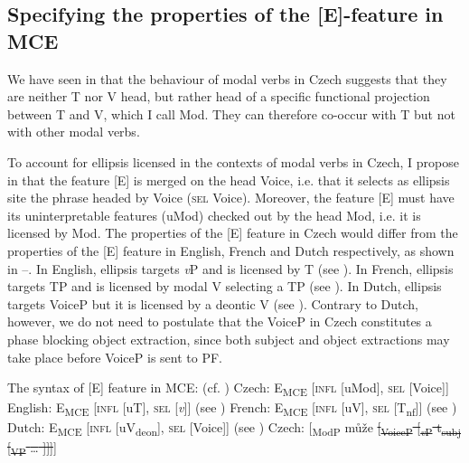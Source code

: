 \documentclass[output=paper,colorlinks,citecolor=brown,
modfonts
]{langscibook}
\begin{document}
\subsection{Specifying the properties of the [E]-feature in MCE} \label{sec:5.1} 

We have seen in  that the behaviour of modal verbs in Czech suggests that they are neither T nor V head, but rather head of a specific functional projection between T and V, which I call Mod. They can therefore co-occur with T but not with other modal verbs. 

To account for ellipsis licensed in the contexts of modal verbs in Czech, I propose in  that the feature [E] is merged on the head Voice, i.e. that it selects as ellipsis site the phrase headed by Voice (\textsc{sel} Voice). Moreover, the feature [E] must have its uninterpretable features (uMod) checked out by the head Mod, i.e. it is licensed by Mod. The properties of the [E] feature in Czech would differ from the properties of the [E] feature in English, French and Dutch respectively, as shown in --. In English, ellipsis targets \textit{v}P and is licensed by T (see \citealt{Merchant2008a}). In French, ellipsis targets TP and is licensed by modal V selecting a TP (see \citealt{Dagnac2008}). In Dutch, ellipsis targets VoiceP but it is licensed by a deontic V (see \citealt{Aelbrecht2008}). Contrary to Dutch, however, we do not need to postulate that the VoiceP in Czech constitutes a phase blocking object extraction, since both subject and object extractions may take place before VoiceP is sent to PF. 


\ea \label{31} The syntax of [E] feature in MCE:
\hfill{(cf. \citealt{Merchant2008a})}
\ea \label{31a} Czech: 	E\textsubscript{MCE} [\textsc{infl} [uMod], \textsc{sel} [Voice]] 
\ex \label{31b} English: E\textsubscript{MCE} [\textsc{infl} [uT], \textsc{sel} [\textit{v}]] \hfill (see \citealt{Merchant2008a})	%
\ex \label{31c} French:	E\textsubscript{MCE} [\textsc{infl} [uV], \textsc{sel} [T\textsubscript{nf}]] \hfill (see \citealt{Dagnac2008}) %
\ex \label{31d} Dutch:	E\textsubscript{MCE} [\textsc{infl} [uV\textsubscript{deon}], \textsc{sel} [Voice]] \hfill (see \citealt{Aelbrecht2008}) %
\z
\z
\ea \label{32}
\ea \label{32a} Czech:	[\textsubscript{ModP} může \sout{[\textsubscript{VoiceP} [\textsubscript{\textit{v}P} t\textsubscript{subj} [\textsubscript{VP} {\ldots} ]]]}]\\
\end{document}
